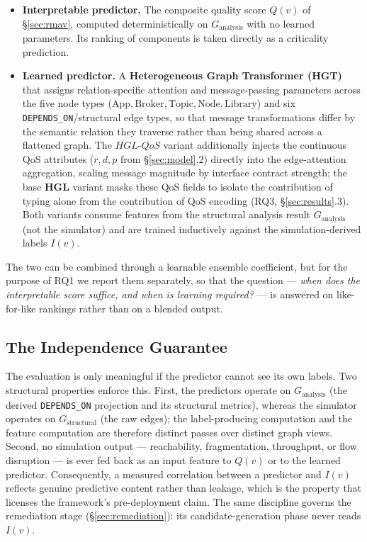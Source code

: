 \documentclass[review]{elsarticle}
\begin{document}
\begin{itemize}
\item \textbf{Interpretable predictor.} The composite quality score $Q(v)$ of \S\ref{sec:rmav},
  computed deterministically on $G_{\text{analysis}}$ with no learned parameters. Its ranking of
  components is taken directly as a criticality prediction.
\item \textbf{Learned predictor.} A \textbf{Heterogeneous Graph Transformer (HGT)} that assigns
  relation-specific attention and message-passing parameters across the five node types
  ($\text{App}, \text{Broker}, \text{Topic}, \text{Node}, \text{Library}$) and six
  \texttt{DEPENDS\_ON}/structural edge types, so that message transformations differ by the semantic
  relation they traverse rather than being shared across a flattened graph. The
  \textbf{$HGL\text{-}QoS$} variant additionally injects the continuous QoS attributes ($r, d, p$
  from \S\ref{sec:model}.2) directly into the edge-attention aggregation, scaling message magnitude
  by interface contract strength; the base \textbf{HGL} variant masks these QoS fields to isolate
  the contribution of typing alone from the contribution of QoS encoding (RQ3, \S\ref{sec:results}.3).
  Both variants consume features from the structural analysis result $G_{\text{analysis}}$ (not the
  simulator) and are trained inductively against the simulation-derived labels $I(v)$.
\end{itemize}

The two can be combined through a learnable ensemble coefficient, but for the purpose of RQ1 we
report them separately, so that the question --- \emph{when does the interpretable score suffice,
and when is learning required?} --- is answered on like-for-like rankings rather than on a blended
output.

\subsection{The Independence Guarantee}

The evaluation is only meaningful if the predictor cannot see its own labels. Two structural
properties enforce this. First, the predictors operate on $G_{\text{analysis}}$ (the derived
\texttt{DEPENDS\_ON} projection and its structural metrics), whereas the simulator operates on
$G_{\text{structural}}$ (the raw edges); the label-producing computation and the feature computation
are therefore distinct passes over distinct graph views. Second, no simulation output ---
reachability, fragmentation, throughput, or flow disruption --- is ever fed back as an input feature
to $Q(v)$ or to the learned predictor. Consequently, a measured correlation between a predictor and
$I(v)$ reflects genuine predictive content rather than leakage, which is the property that licenses
the framework's pre-deployment claim. The same discipline governs the remediation stage
(\S\ref{sec:remediation}): its candidate-generation phase never reads $I(v)$.
\end{document}
